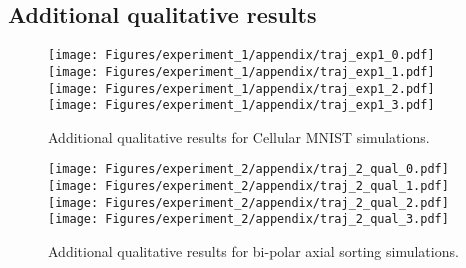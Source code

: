 \subsection{Additional qualitative results}\label{sec:app-qualitative-all}


\begin{figure}[h]
    \centering
    \texttt{[image: Figures/experiment\_1/appendix/traj\_exp1\_0.pdf]}
    \texttt{[image: Figures/experiment\_1/appendix/traj\_exp1\_1.pdf]}\\
        \texttt{[image: Figures/experiment\_1/appendix/traj\_exp1\_2.pdf]}
    \texttt{[image: Figures/experiment\_1/appendix/traj\_exp1\_3.pdf]}  
    \caption{Additional qualitative results for Cellular MNIST simulations.}
    \label{fig:exp-1-qualitative-appendix}
\end{figure}


\begin{figure}[h]
    \centering
    \texttt{[image: Figures/experiment\_2/appendix/traj\_2\_qual\_0.pdf]}
    \texttt{[image: Figures/experiment\_2/appendix/traj\_2\_qual\_1.pdf]}\\
        \texttt{[image: Figures/experiment\_2/appendix/traj\_2\_qual\_2.pdf]}
    \texttt{[image: Figures/experiment\_2/appendix/traj\_2\_qual\_3.pdf]}    
    \caption{Additional qualitative results for bi-polar axial sorting simulations.}
    \label{fig:exp-2-qualitative-appendix}
\end{figure}
